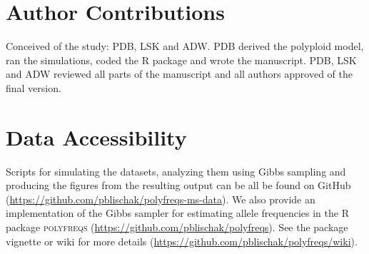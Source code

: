 \documentclass[11pt,english,letterpaper,oneside]{article}
\begin{document}
\section*{Author Contributions}        %

Conceived of the study: PDB, LSK and ADW. PDB derived the polyploid model, ran the simulations, coded the R package and wrote the manuscript. PDB, LSK and ADW reviewed all parts of the manuscript and all authors approved of the final version.
\medskip

\section*{Data Accessibility}            %

Scripts for simulating the datasets, analyzing them using Gibbs sampling and producing the figures from the resulting output can be all be found on GitHub (\url{https://github.com/pblischak/polyfreqs-ms-data}). We also provide an implementation of the Gibbs sampler for estimating allele frequencies in the R package \textsc{polyfreqs} (\url{https://github.com/pblischak/polyfreqs}). See the package vignette or wiki for more details (\url{https://github.com/pblischak/polyfreqs/wiki}).
\vfill


\singlespacing




\vfill

\end{document}
